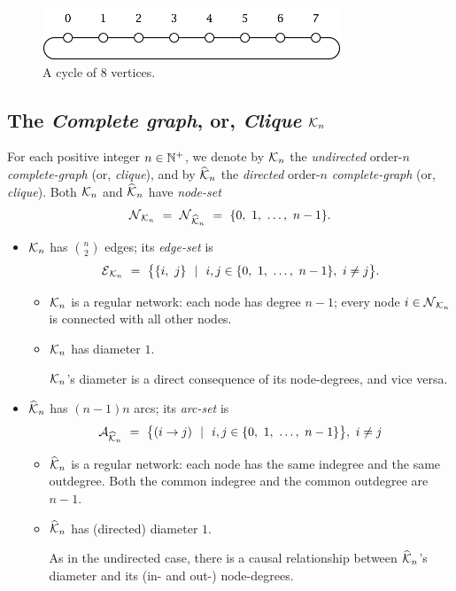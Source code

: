 \begin{figure}[hbt]
\begin{center}
       \includegraphics[scale=0.6]{FiguresGraph/cycle}
       \caption{A cycle of $8$ vertices.}
  \label{fig:cycle}
\end{center}
\end{figure}

\subsection{The {\it Complete graph}, or, {\it Clique} $\mbox{$\cal K$}_n$}
\label{sec:clique}
 

For each positive integer $n \in \mathbb{N}^+$, we denote by $\mbox{$\cal K$}_n$ the {\em
  undirected} order-$n$ {\it complete-graph} (or, {\it clique}),
  and by $\widehat{\mbox{$\cal K$}}_n$ the {\em
  directed} order-$n$ {\it complete-graph} (or, {\it clique}).  Both
$\mbox{$\cal K$}_n$ and $\widehat{\mbox{$\cal K$}}_n$ have {\it node-set}
\[ \mbox{$\cal N$}_{{\cal K}_n} \ = \ \mbox{$\cal N$}_{\widehat{{\cal K}}_n}
\ = \ \{ 0, \ 1, \ \ldots, \ n-1\}. \]
\begin{itemize}
\item
$\mbox{$\cal K$}_n$ has $\displaystyle {n \choose 2}$ edges; its {\it edge-set} is
\[ \mbox{$\cal E$}_{{\cal K}_n} \ = \
\big\{ \{i, \ j\} \ \ | \ \ i,j \in \{0, \ 1, \ \ldots, \ n-1\}, \ i
\neq j \big\}.
\]
  \begin{itemize}
  \item {} 
$\mbox{$\cal K$}_n$ is a regular network: each node has degree $n-1$; every node $i
\in \mbox{$\cal N$}_{\mbox{{\scriptsize $\cal K$}}_n}$ is connected with all other nodes.

   \item {}
$\mbox{$\cal K$}_n$ has diameter $1$.

$\mbox{$\cal K$}_n$'s diameter is a direct consequence of its node-degrees, and vice versa.
  \end{itemize}

\item
$\widehat{\mbox{$\cal K$}}_n$ has $(n-1)n$ arcs; its {\it arc-set} is
\[ \a_{\widehat{{\cal K}}_n} \ = \ 
\big\{ (i \rightarrow j) \ \ | \ \ i,j \in \{0, \ 1, \ \ldots, \ n-1\}
\big\}, \ i \neq j
\]
  \begin{itemize}
  \item
$\widehat{\mbox{$\cal K$}}_n$ is a regular network: each node has the same indegree
    and the same outdegree.  Both the common indegree and the common
    outdegree are $n-1$.
  \item
$\widehat{\mbox{$\cal K$}}_n$ has (directed) diameter $1$.

As in the undirected case, there is a causal relationship between
$\widehat{\mbox{$\cal K$}}_n$'s diameter and its (in- and out-) node-degrees.
  \end{itemize}
\end{itemize}

